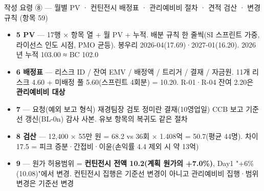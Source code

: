\begin{frame}{작성 요령 ⑧ — 월별 PV · 컨틴전시 배정표 · 관리예비비 절차 · 견적 검산 · 변경 규칙 (항목 5\til{}9)}
\begin{itemize}
\item \textbf{5 PV} — 17행 × 항목 열 + 월 PV + 누적. 배분 규칙 한 줄씩(SI 스프린트 가중, 라이선스 인도 시점, PMO 균등). 봉우리 2026-04(17.69)·2027-01(16.20). 2026년 누적 103.00 ≈ BC 102.0
\item \textbf{6 배정표} — 리스크 ID / 잔여 EMV / 배정액 / 트리거 / 결재 / 자금원. 11개 리스크 4.60 + 미배정 풀 5.60(스프린트 4회분) = 10.20. R-01·R-04 잔여 2.20은 \textbf{관리예비비 대상}
\item \textbf{7} — 요청(예외 보고 형식) \ra{} 재경팀장 검토 \ra{} 정미란 결재(10영업일) \ra{} CCB 보고 \ra{} 기준선 갱신(BL-0n) \ra{} 감사 사본. 유보 항목의 복귀도 같은 절차
\item \textbf{8 검산} — 12,400 × 55만 원 = 68.2 vs 36회 × 1.408억 = 50.7(평균 44명). 차이 17.5 = 피크 증분·간접비·이윤(손익률 4.4 제외 시 약 13억)
\item \textbf{9} — 원가 허용범위 = \textbf{컨틴전시 전액 10.2(계획 원가의 +7.0\%)}, Day1 "+6\%(10.08)"에서 변경. 컨틴전시 집행은 기준선 변경이 아니고 관리예비비 집행·범위 변경은 기준선 변경
\end{itemize}
\end{frame}

